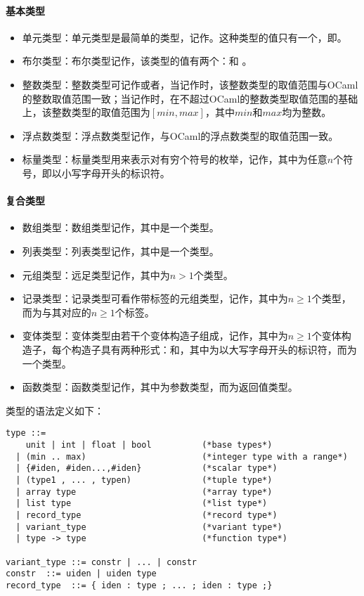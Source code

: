 \paragraph{基本类型}
\begin{itemize}
	\item 单元类型：单元类型是最简单的类型，记作。这种类型的值只有一个，即\code{()}。
	\item 布尔类型：布尔类型记作，该类型的值有两个：和 。
	\item 整数类型：整数类型可记作或者，当记作时，该整数类型的取值范围与OCaml的整数取值范围一致；当记作时，在不超过OCaml的整数类型取值范围的基础上，该整数类型的取值范围为$[min,max]$，其中$min$和$max$均为整数。
	\item 浮点数类型：浮点数类型记作，与OCaml的浮点数类型的取值范围一致。
	\item 标量类型：标量类型用来表示对有穷个符号的枚举，记作，其中为任意$n$个符号，即以小写字母开头的标识符。
\end{itemize}
\paragraph{复合类型}
\begin{itemize}
	\item 数组类型：数组类型记作，其中是一个类型。
	\item 列表类型：列表类型记作，其中是一个类型。
	\item 元组类型：远足类型记作，其中为$n>1$个类型。
	\item 记录类型：记录类型可看作带标签的元组类型，记作，其中为$n\ge 1$个类型，而为与其对应的$n\ge 1$个标签。
	\item 变体类型：变体类型由若干个变体构造子组成，记作，其中为$n\ge 1$个变体构造子，每个构造子具有两种形式：和，其中为以大写字母开头的标识符，而为一个类型。
	\item 函数类型：函数类型记作，其中为参数类型，而为返回值类型。
\end{itemize}
类型的语法定义如下：
\begin{verbatim}
type ::= 
    unit | int | float | bool          (*base types*)
  | (min .. max)                       (*integer type with a range*)
  | {#iden, #iden...,#iden}            (*scalar type*)
  | (type1 , ... , typen)              (*tuple type*)
  | array type                         (*array type*)
  | list type                          (*list type*)
  | record_type                        (*record type*)
  | variant_type                       (*variant type*)
  | type -> type                       (*function type*)

variant_type ::= constr | ... | constr
constr  ::= uiden | uiden type
record_type  ::= { iden : type ; ... ; iden : type ;}
\end{verbatim}
